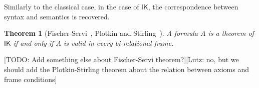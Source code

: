 \documentclass[a4paper]{article}
\theoremstyle{plain}
\newtheorem{theorem}{Theorem}[section]
\theoremstyle{definition}
\newcommand{\marianela}[1]{{\color{purple}[Marianela: #1]}}
\newcommand{\lutz}[1]{{\color{notgreen}[Lutz: #1]}}
\newcommand{\todo}[1]{{\color{red}[TODO: #1]}}
\newcommand*{\IK}{\mathsf{IK}}
\newcommand*{\NOT}{\neg}
\newcommand*{\AND}{\mathbin{\wedge}}
\newcommand*{\TOP}{\mathord{\top}}
\newcommand*{\OR}{\mathbin{\vee}}
\newcommand*{\BOT}{\mathord{\bot}}
\newcommand*{\IMP}{\mathbin{\scalebox{.9}{\raise.2ex\hbox{$\supset$}}}}
\newcommand*{\BOX}{\mathord{\Box}}
\newcommand*{\DIA}{\mathord{\Diamond}}
\begin{document}
Similarly to the classical case, in the case of $\IK$, the correspondence between syntax and semantics is recovered.

\begin{theorem}[Fischer-Servi~\cite{Fischer}, Plotkin and Stirling~\cite{Plotkin}]\label{thm:plotkin}
	A formula $A$ is a theorem of $\IK$ if and only if $A$ is valid in every bi-relational frame.
\end{theorem}

\todo{Add something else about Fischer-Servi theorem?}\lutz{no, but we should add the Plotkin-Stirling theorem about the relation between axioms and frame conditions}
%
%
%
%
%
\end{document}
